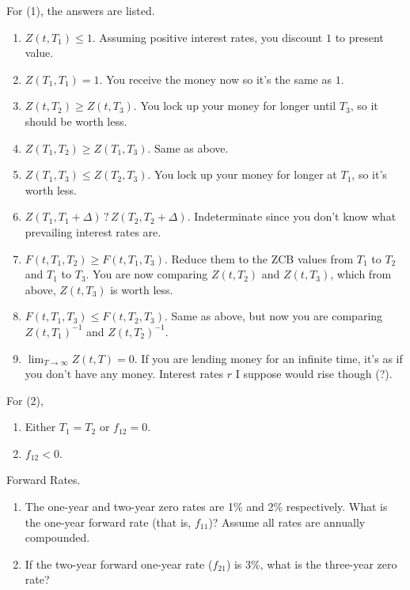 \documentclass{article}
\begin{document}
    \begin{solution}[Blyth 3.1]
      For (1), the answers are listed. 
      \begin{enumerate}
        \item $Z(t, T_1) \leq 1$. Assuming positive interest rates, you discount $1$ to present value.  
        \item $Z(T_1, T_1) = 1$. You receive the money now so it's the same as $1$. 
        \item $Z(t, T_2) \geq Z(t, T_3)$. You lock up your money for longer until $T_3$, so it should be worth less. 
        \item $Z(T_1, T_2) \geq Z(T_1, T_3)$. Same as above.  
        \item $Z(T_1, T_3) \leq Z(T_2, T_3)$. You lock up your money for longer at $T_1$, so it's worth less. 
        \item $Z(T_1, T_1 + \Delta) \, ? \, Z(T_2, T_2 + \Delta)$. Indeterminate since you don't know what prevailing interest rates are. 
        \item $F(t, T_1, T_2) \geq F(t, T_1, T_3)$. Reduce them to the ZCB values from $T_1$ to $T_2$ and $T_1$ to $T_3$. You are now comparing $Z(t, T_2)$ and $Z(t, T_3)$, which from above, $Z(t, T_3)$ is worth less. 
        \item $F(t, T_1, T_3) \leq F(t, T_2, T_3)$. Same as above, but now you are comparing $Z(t, T_1)^{-1}$ and $Z(t, T_2)^{-1}$. 
        \item $\lim_{T \rightarrow \infty} Z(t, T) = 0$. If you are lending money for an infinite time, it's as if you don't have any money. Interest rates $r$ I suppose would rise though (?). 
      \end{enumerate}
      For (2), 
      \begin{enumerate}
        \item Either $T_1 = T_2$ or $f_{12} = 0$. 
        \item $f_{12} < 0$. 
      \end{enumerate}
    \end{solution}

    \begin{exercise}[Blyth 3.2]
      Forward Rates. 
      \begin{enumerate}
        \item The one-year and two-year zero rates are 1\% and 2\% respectively. What is the one-year forward rate (that is, $f_{11}$)? Assume all rates are annually compounded. 
        \item If the two-year forward one-year rate ($f_{21}$) is 3\%, what is the three-year zero rate? 
      \end{enumerate}
    \end{exercise}
\end{document}
